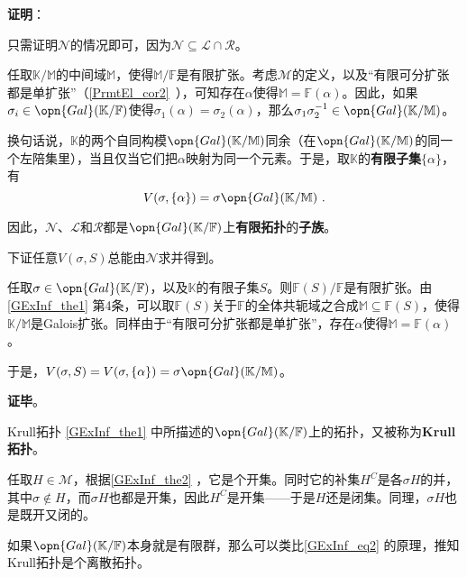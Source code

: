 \textbf{证明}：

只需证明$\mathcal{N}$的情况即可，因为$\mathcal{N}\subseteq \mathcal{L}\cap\mathcal{R}$。

任取$\mathbb{K}/\mathbb{M}$的中间域$\mathbb{M}$，使得$\mathbb{M}/\mathbb{F}$是有限扩张。考虑$\mathcal{M}$的定义，以及“有限可分扩张都是单扩张”（\autoref{PrmtEl_cor2}~），可知存在$\alpha$使得$\mathbb{M}=\mathbb{F}(\alpha)$。因此，如果$\sigma_i\in\opn{Gal}(\mathbb{K}/\mathbb{F})$使得$\sigma_1(\alpha)=\sigma_2(\alpha)$，那么$\sigma_1\sigma_2^{-1}\in\opn{Gal}(\mathbb{K}/\mathbb{M})$。

换句话说，$\mathbb{K}$的两个自同构模$\opn{Gal}(\mathbb{K}/\mathbb{M})$同余（在$\opn{Gal}(\mathbb{K}/\mathbb{M})$的同一个左陪集里），当且仅当它们把$\alpha$映射为同一个元素。于是，取$\mathbb{K}$的\textbf{有限子集}$\{\alpha\}$，有
\begin{equation}\label{GExInf_eq2}
V(\sigma, \{\alpha\}) = \sigma \opn{Gal}(\mathbb{K}/\mathbb{M})~.
\end{equation}

因此，$\mathcal{N}$、$\mathcal{L}$和$\mathcal{R}$都是$\opn{Gal}(\mathbb{K}/\mathbb{F})$上\textbf{有限拓扑}的\textbf{子族}。

下证任意$V(\sigma, S)$总能由$\mathcal{N}$求并得到。

任取$\sigma\in\opn{Gal}(\mathbb{K}/\mathbb{F})$，以及$\mathbb{K}$的有限子集$S$。则$\mathbb{F}(S)/\mathbb{F}$是有限扩张。由\autoref{GExInf_the1} 第4条，可以取$\mathbb{F}(S)$关于$\mathbb{F}$的全体共轭域之合成$\mathbb{M}\subseteq\mathbb{F}(S)$，使得$\mathbb{K}/\mathbb{M}$是Galois扩张。同样由于“有限可分扩张都是单扩张”，存在$\alpha$使得$\mathbb{M}=\mathbb{F}(\alpha)$。

于是，$V(\sigma, S)=V(\sigma, \{\alpha\})=\sigma \opn{Gal}(\mathbb{K}/\mathbb{M})$。

\textbf{证毕}。

\begin{definition}{Krull拓扑}\label{GExInf_def1}
\autoref{GExInf_the1} 中所描述的$\opn{Gal}(\mathbb{K}/\mathbb{F})$上的拓扑，又被称为\textbf{Krull 拓扑}。
\end{definition}

任取$H\in\mathcal{M}$，根据\autoref{GExInf_the2} ，它是个开集。同时它的补集$H^C$是各$\sigma H$的并，其中$\sigma\not\in H$，而$\sigma H$也都是开集，因此$H^C$是开集——于是$H$还是闭集。同理，$\sigma H$也是既开又闭的。

如果$\opn{Gal}(\mathbb{K}/\mathbb{F})$本身就是有限群，那么可以类比\autoref{GExInf_eq2} 的原理，推知Krull拓扑是个离散拓扑。


